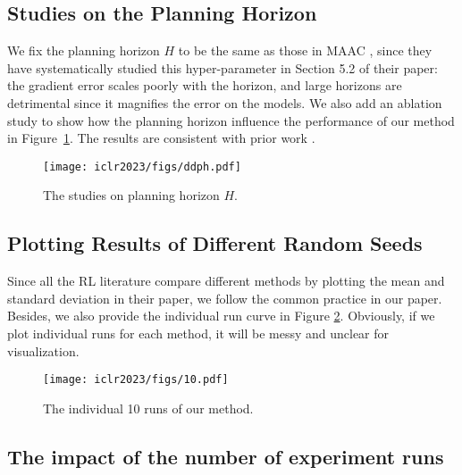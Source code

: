 \documentclass{article} %
\newcommand{\revision}[1]{{#1}}
\begin{document}
\subsection{\revision{Studies on the Planning Horizon}}
\revision{We fix the planning horizon $H$ to be the same as those in MAAC \cite{clavera_model-augmented_2019}, since they have systematically studied  this hyper-parameter in Section 5.2 of their paper: the gradient error scales poorly with the horizon, and large horizons are detrimental since it magnifies the error on the models. We also  add an ablation study to show how the planning horizon influence the performance of our method in Figure~\ref{fig:planninghorizon}. The results are consistent with prior work \cite{janner_when_2019,clavera_model-augmented_2019}.}
\begin{figure}[!htb]
    \centering
    \texttt{[image: iclr2023/figs/ddph.pdf]}
    \caption{The studies on planning horizon $H$.}
    \label{fig:planninghorizon}
\end{figure}

\subsection{\revision{Plotting Results of Different Random Seeds}}
\revision{Since all the RL literature  compare  different methods by plotting the mean and standard deviation in their paper, we follow the common practice in our paper. Besides, we also provide the individual run curve in Figure \ref{fig:individualrun}. Obviously, if we plot individual runs for each method, it will be messy and unclear for visualization.}
\begin{figure}[!htb]
    \centering
    \texttt{[image: iclr2023/figs/10.pdf]}
    \caption{The individual 10 runs of our method.}
    \label{fig:individualrun}
\end{figure}

\subsection{\revision{The impact of the number of experiment runs}}
\end{document}
